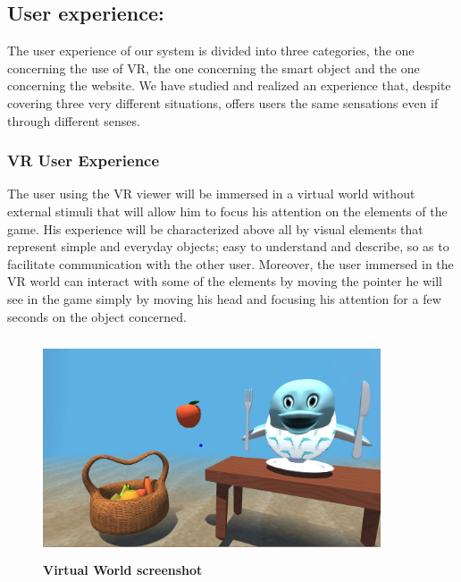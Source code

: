 \documentclass [12pt]{article}
\begin{document}
\subsection{User experience:}
The user experience of our system is divided into three categories, the one concerning the use of VR, the one concerning the smart object and the one concerning the website. 
We have studied and realized an experience that, despite covering three very different situations, offers users the same sensations even if through different senses.
\subsubsection{VR User Experience}
The user using the VR viewer will be immersed in a virtual world without external stimuli that will allow him to focus his attention on the elements of the game. His experience will be characterized above all by visual elements that represent simple and everyday objects; easy to understand and describe, so as to facilitate communication with the other user. 
Moreover, the user immersed in the VR world can interact with some of the elements by moving the pointer he will see in the game simply by moving his head and focusing his attention for a few seconds on the object concerned.
\begin{figure}[ht!]
\centering
\includegraphics[height=6.5cm,width=10cm]{VirtualWorld.jpg}
\caption{\textbf{Virtual World screenshot}}
\end{figure}
\clearpage
\end{document}
